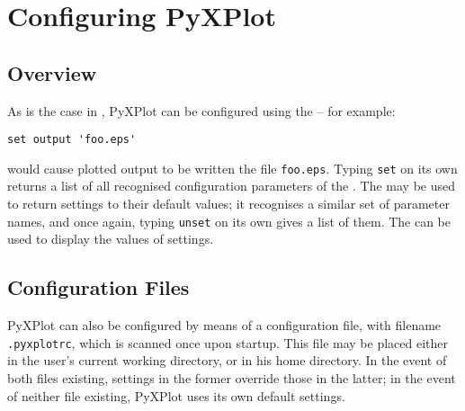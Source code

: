 %
%
%
%
%



\chapter{Configuring PyXPlot}

\section{Overview}

\label{configuration}

As is the case in \gnuplot, PyXPlot can be configured using the 
-- for example:

\begin{verbatim}set output 'foo.eps'\end{verbatim}

\noindent would cause plotted output to be written the file {\tt foo.eps}.
Typing {\tt set} on its own returns a list of all recognised configuration
parameters of the . The  may be used to return
settings to their default values; it recognises a similar set of parameter
names, and once again, typing {\tt unset} on its own gives a list of them. The
 can be used to display the values of settings.

\section{Configuration Files}
\label{config_files}

PyXPlot can also be configured by means of a configuration file, with filename
{\tt .pyxplotrc}, which is scanned once upon startup. This file may be
placed either in the user's current working directory, or in his home
directory. In the event of both files existing, settings in the former override
those in the latter; in the event of neither file existing, PyXPlot uses its
own default settings.

